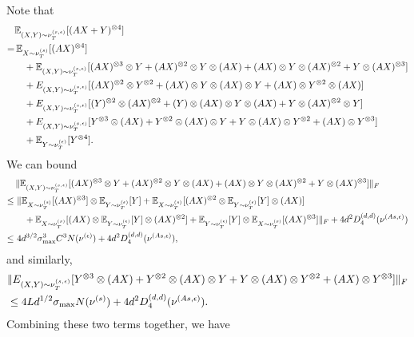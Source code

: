 Note that 
\begin{align*}
& \mathbb{E}_{(X,Y)\sim \nu_T^{(s,\epsilon)}} [(AX+Y)^{\otimes 4}]\\
 = & \,\mathbb{E}_{X\sim \nu_T^{(s)}}[(AX)^{\otimes 4}] \\
& \quad+ \mathbb{E}_{(X,Y)\sim \nu_T^{(s,\epsilon)}} [(AX)^{\otimes 3}\otimes Y + (AX)^{\otimes 2}\otimes Y\otimes (AX) + (AX)\otimes Y\otimes (AX)^{\otimes 2} + Y\otimes (AX)^{\otimes 3}] \\
& \quad+ E_{(X,Y)\sim \nu_T^{(s,\epsilon)}} [ (AX)^{\otimes 2}\otimes Y^{\otimes 2} + (AX)\otimes Y\otimes (AX)\otimes Y + (AX)\otimes Y^{\otimes 2}\otimes (AX)]\\
& \quad+  E_{(X,Y)\sim \nu_T^{(s,\epsilon)}} [ (Y)^{\otimes 2}\otimes (AX)^{\otimes 2} + (Y)\otimes (AX)\otimes Y\otimes (AX) + Y\otimes (AX)^{\otimes 2}\otimes Y] \\
& \quad+ E_{(X,Y)\sim \nu_T^{(s,\epsilon)}} [Y^{\otimes 3}\otimes (AX) + Y^{\otimes 2}\otimes (AX)\otimes Y + Y\otimes (AX)\otimes Y^{\otimes 2} + (AX)\otimes Y^{\otimes 3}] \\
& \quad+ \mathbb{E}_{Y\sim \nu_T^{(\epsilon)}}[Y^{\otimes 4}].
\end{align*}
We can bound
\begin{align*}
& \| \mathbb{E}_{(X,Y)\sim \nu_T^{(s,\epsilon)}} [(AX)^{\otimes 3}\otimes Y + (AX)^{\otimes 2}\otimes Y\otimes (AX) + (AX)\otimes Y\otimes (AX)^{\otimes 2} + Y\otimes (AX)^{\otimes 3}] \|_F \\
\le \,& \,  \| \mathbb{E}_{X\sim \nu_T^{(s)}} [(AX)^{\otimes 3}] \otimes \mathbb{E}_{Y\sim \nu_T^{(\epsilon)}}[Y] + \mathbb{E}_{X\sim \nu_T^{(s)}} [(AX)^{\otimes 2} \otimes \mathbb{E}_{Y\sim \nu_T^{(\epsilon)}}[Y] \otimes (AX)] \\
& \quad + \mathbb{E}_{X\sim \nu_T^{(s)}} [(AX) \otimes \mathbb{E}_{Y\sim \nu_T^{(\epsilon)}}[Y] \otimes (AX)^{\otimes 2}]  + \mathbb{E}_{Y\sim \nu_T^{(\epsilon)}}[Y] \otimes \mathbb{E}_{X\sim \nu_T^{(s)}} [(AX)^{\otimes 3}] \|_F + 4d^2D_4^{(d,d)}(\nu^{(As,\epsilon)}) \\
\le \, & \,4d^{3/2}\sigma^3_{\max}C^3N(\nu^{(\epsilon)}) + 4d^2D_4^{(d,d)}(\nu^{(As,\epsilon)}),
\end{align*}
and similarly, 
\begin{align*}
& \| E_{(X,Y)\sim \nu_T^{(s,\epsilon)}} [Y^{\otimes 3}\otimes (AX) + Y^{\otimes 2}\otimes (AX)\otimes Y + Y\otimes (AX)\otimes Y^{\otimes 2} + (AX)\otimes Y^{\otimes 3}] \|_F \\
& \le 4Ld^{1/2}\sigma_{\max}N(\nu^{(s)})+ 4d^2D_4^{(d,d)}(\nu^{(As,\epsilon)}).
\end{align*}
Combining these two terms together, we have 
